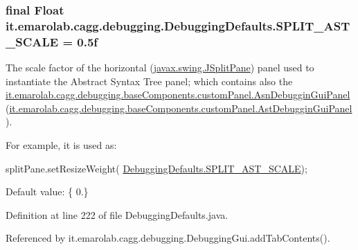 \hypertarget{classit_1_1emarolab_1_1cagg_1_1debugging_1_1DebuggingDefaults_a966c4e9378b69ec91c93037309dabf94}{
\subsubsection[{S\-P\-L\-I\-T\-\_\-\-A\-S\-T\-\_\-\-S\-C\-A\-L\-E}]{\setlength{\rightskip}{0pt plus 5cm}final Float it.\-emarolab.\-cagg.\-debugging.\-Debugging\-Defaults.\-S\-P\-L\-I\-T\-\_\-\-A\-S\-T\-\_\-\-S\-C\-A\-L\-E = 0.\-5f\hspace{0.3cm}{\ttfamily [static]}}}\label{classit_1_1emarolab_1_1cagg_1_1debugging_1_1DebuggingDefaults_a966c4e9378b69ec91c93037309dabf94}
The scale factor of the horizontal (\hyperlink{}{javax.\-swing.\-J\-Split\-Pane}) panel used to instantiate the Abstract Syntax Tree panel; which contains also the \hyperlink{classit_1_1emarolab_1_1cagg_1_1debugging_1_1baseComponents_1_1customPanel_1_1AsnDebugginGuiPanel}{it.\-emarolab.\-cagg.\-debugging.\-base\-Components.\-custom\-Panel.\-Asn\-Debuggin\-Gui\-Panel} (\hyperlink{classit_1_1emarolab_1_1cagg_1_1debugging_1_1baseComponents_1_1customPanel_1_1AstDebugginGuiPanel}{it.\-emarolab.\-cagg.\-debugging.\-base\-Components.\-custom\-Panel.\-Ast\-Debuggin\-Gui\-Panel}).\par
 For example, it is used as\-:
\begin{DoxyCode}
splitPane.setResizeWeight( \hyperlink{classit_1_1emarolab_1_1cagg_1_1debugging_1_1DebuggingDefaults_a966c4e9378b69ec91c93037309dabf94}{DebuggingDefaults.SPLIT\_AST\_SCALE}); 
\end{DoxyCode}
 \par
 Default value\-: \{ 0.\} 

Definition at line 222 of file Debugging\-Defaults.\-java.



Referenced by it.\-emarolab.\-cagg.\-debugging.\-Debugging\-Gui.\-add\-Tab\-Contents().

